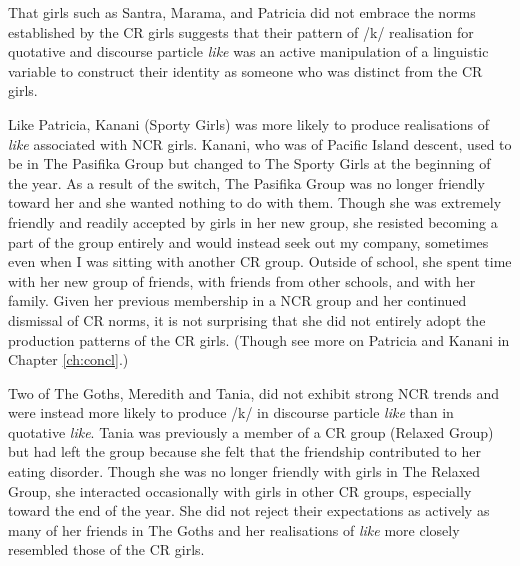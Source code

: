  

That girls such as Santra, Marama, and Patricia did not embrace the norms established by the CR girls suggests that their pattern of /k/ realisation for quotative and discourse particle \textit{like} was an active manipulation of a linguistic variable to construct their identity as someone who was distinct from the CR girls.

Like Patricia, Kanani (Sporty Girls) was more likely to produce realisations of \textit{like} associated with NCR girls. Kanani, who was of Pacific Island descent, used to be in The Pasifika Group but changed to The Sporty Girls at the beginning of the year. As a result of the switch, The Pasifika Group was no longer friendly toward her and she wanted nothing to do with them. Though she was extremely friendly and readily accepted by girls in her new group, she resisted becoming a part of the group entirely and would instead seek out my company, sometimes even when I was sitting with another CR group. Outside of school, she spent time with her new group of friends, with friends from other schools, and with her family. Given her previous membership in a NCR group and her continued dismissal of CR norms, it is not surprising that she did not entirely adopt the production patterns of the CR girls. (Though see more on Patricia and Kanani in Chapter \ref{ch:concl}.)

Two of The Goths, Meredith and Tania, did not exhibit strong NCR trends and were instead more likely to produce /k/ in discourse particle \textit{like} than in quotative \textit{like}. Tania was previously a member of a CR group (Relaxed Group) but had left the group because she felt that the friendship contributed to her eating disorder. Though she was no longer friendly with girls in The Relaxed Group, she interacted occasionally with girls in other CR groups, especially toward the end of the year. She did not reject their expectations as actively as many of her friends in The Goths and her realisations of \textit{like} more closely resembled those of the CR girls. 

